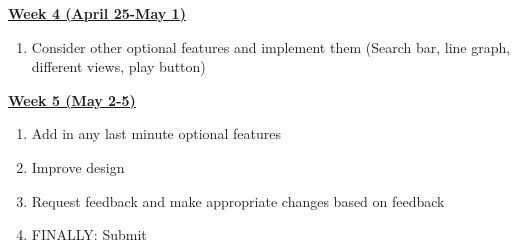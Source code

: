 \documentclass[12pt]{article}
\begin{document}
\underline{\textbf{Week 4 (April 25-May 1)}}
\begin{enumerate}
\item Consider other optional features and implement them
(Search bar, line graph, different views, play button)
\end{enumerate}

\underline{\textbf{Week 5 (May 2-5)}}
\begin{enumerate}
\item Add in any last minute optional features
\item Improve design
\item Request feedback and make appropriate changes based on feedback
\item FINALLY: Submit
\end{enumerate}
\end{document}

